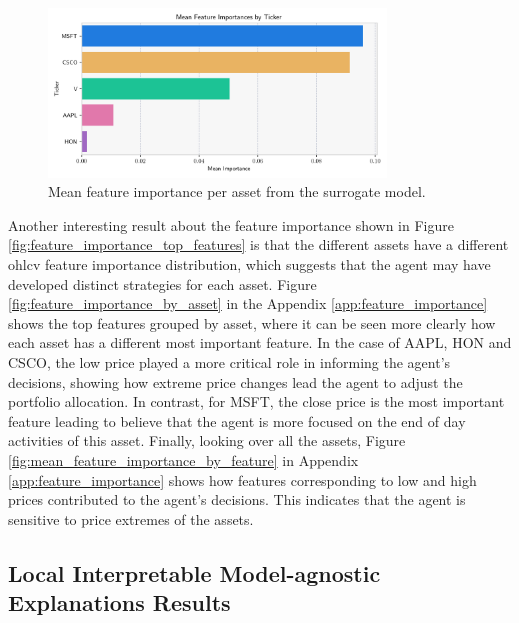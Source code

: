 \begin{figure}
    \centering
    \includegraphics[width=0.8\textwidth]{figures/feature_importance_mean_ticker.png}
    \caption{Mean feature importance per asset from the surrogate model.}
    \label{fig:mean_feature_importance_by_asset}
\end{figure}

Another interesting result about the feature importance shown in Figure \ref{fig:feature_importance_top_features} is that the different assets have a different \acrshort{ohlcv} feature importance distribution, which suggests that the agent may have developed distinct strategies for each asset. Figure \ref{fig:feature_importance_by_asset} in the Appendix \ref{app:feature_importance} shows the top features grouped by asset, where it can be seen more clearly how each asset has a different most important feature. In the case of AAPL, HON and CSCO, the low price played a more critical role in informing the agent's decisions, showing how extreme price changes lead the agent to adjust the portfolio allocation. In contrast, for MSFT, the close price is the most important feature leading to believe that the agent is more focused on the end of day activities of this asset. Finally, looking over all the assets, Figure \ref{fig:mean_feature_importance_by_feature} in Appendix \ref{app:feature_importance} shows how features corresponding to low and high prices contributed to the agent's decisions. This indicates that the agent is sensitive to price extremes of the assets.

\subsection{Local Interpretable Model-agnostic Explanations Results} \label{sec:lime-results}

